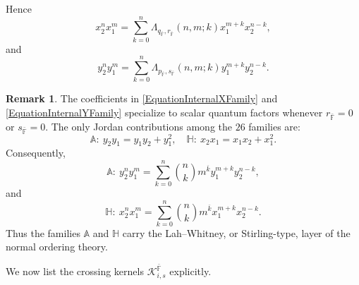 \documentclass{amsart}
\theoremstyle{definition}
\newtheorem{remark}[theorem]{Remark}
\theoremstyle{remark}
\numberwithin{equation}{section}
\begin{document}
Hence
\begin{equation}\label{EquationInternalXFamily}
x_2^nx_1^m
=
\sum_{k=0}^{n}
\Lambda_{q_{\bar{\mathbb{F}}},r_{\bar{\mathbb{F}}}}(n,m;k)
x_1^{m+k}x_2^{n-k},
\end{equation}
and
\begin{equation}\label{EquationInternalYFamily}
y_2^ny_1^m
=
\sum_{k=0}^{n}
\Lambda_{p_{\bar{\mathbb{F}}},s_{\bar{\mathbb{F}}}}(n,m;k)
y_1^{m+k}y_2^{n-k}.
\end{equation}

\begin{remark}\label{RemarkJordanStirlingExplicit}
The coefficients in \eqref{EquationInternalXFamily} and \eqref{EquationInternalYFamily} specialize to scalar quantum factors whenever $r_{\bar{\mathbb{F}}}=0$ or $s_{\bar{\mathbb{F}}}=0$. The only Jordan contributions among the $26$ families are:
\[
\mathbb{A}:\ y_2y_1=y_1y_2+y_1^2,
\quad
\mathbb{H}:\ x_2x_1=x_1x_2+x_1^2.
\]
Consequently,
\[
\mathbb{A}:\
y_2^ny_1^m
=
\sum_{k=0}^{n}
\binom{n}{k}m^{\overline{k}}
y_1^{m+k}y_2^{n-k},
\]
and
\[
\mathbb{H}:\
x_2^nx_1^m
=
\sum_{k=0}^{n}
\binom{n}{k}m^{\overline{k}}
x_1^{m+k}x_2^{n-k}.
\]
Thus the families $\mathbb{A}$ and $\mathbb{H}$ carry the Lah--Whitney, or Stirling-type, layer of the normal ordering theory.
\end{remark}

We now list the crossing kernels $\mathscr{K}_{i,s}^{\bar{\mathbb{F}}}$ explicitly.
\end{document}
